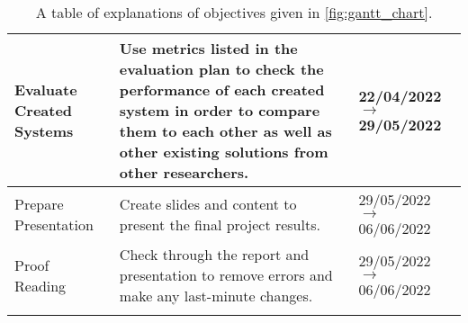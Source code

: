\begin{longtable}{|| P{0.2\textwidth} | P{.45\textwidth} | P{.15\textwidth} ||}
    \hline
    Evaluate Created Systems                             & Use metrics listed in the evaluation plan to check the performance of each created system in order to compare them to each other as well as other existing solutions from other researchers.                                                                                                                                                                                                                                      & 22/04/2022 $ \rightarrow $ 29/05/2022     \\
    \hline
    Prepare Presentation                                 & Create slides and content to present the final project results.                                                                                                                                                                                                                                                                                                                                                                   & 29/05/2022 $ \rightarrow $ 06/06/2022     \\
    \hline
    Proof Reading                                        & Check through the report and presentation to remove errors and make any last-minute changes.                                                                                                                                                                                                                                                                                                                                      & 29/05/2022 $ \rightarrow $ 06/06/2022     \\
    \hline
    \caption{A table of explanations of objectives given in \autoref{fig:gantt_chart}.}
    \label{tab:objectives_table}
\end{longtable}